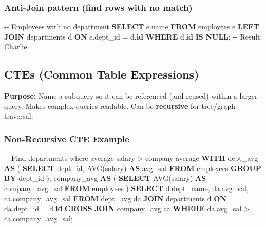 \documentclass[11pt]{article}
\newenvironment{Shaded}{\begin{snugshade}}{\end{snugshade}}
\newcommand{\CommentTok}[1]{\textcolor[rgb]{0.48,0.49,0.49}{#1}}
\newcommand{\FunctionTok}[1]{\textcolor[rgb]{0.56,0.27,0.68}{#1}}
\newcommand{\KeywordTok}[1]{\textcolor[rgb]{0.81,0.81,0.76}{\textbf{#1}}}
\newcommand{\NormalTok}[1]{\textcolor[rgb]{0.81,0.81,0.76}{#1}}
\newcommand{\OperatorTok}[1]{\textcolor[rgb]{0.81,0.81,0.76}{#1}}
\begin{document}
\subsubsection{Anti-Join pattern (find rows with no match)}\label{anti-join-pattern-find-rows-with-no-match}


\begin{Shaded}
\begin{Highlighting}[]
\CommentTok{{-}{-} Employees with no department}
\KeywordTok{SELECT}\NormalTok{ e.name}
\KeywordTok{FROM}\NormalTok{ employees e}
\KeywordTok{LEFT} \KeywordTok{JOIN}\NormalTok{ departments d }\KeywordTok{ON}\NormalTok{ e.dept\_id }\OperatorTok{=}\NormalTok{ d.}\KeywordTok{id}
\KeywordTok{WHERE}\NormalTok{ d.}\KeywordTok{id} \KeywordTok{IS} \KeywordTok{NULL}\NormalTok{;}
\CommentTok{{-}{-} Result: Charlie}
\end{Highlighting}
\end{Shaded}

\subsection{CTEs (Common Table Expressions)}\label{ctes-common-table-expressions}

\textbf{Purpose:} Name a subquery so it can be referenced (and reused) within a larger query. Makes complex queries readable. Can be \textbf{recursive} for tree/graph traversal.

\subsubsection{Non-Recursive CTE Example}\label{non-recursive-cte-example}


\begin{Shaded}
\begin{Highlighting}[]
\CommentTok{{-}{-} Find departments where average salary \textgreater{} company average}
\KeywordTok{WITH}\NormalTok{ dept\_avg }\KeywordTok{AS}\NormalTok{ (}
    \KeywordTok{SELECT}\NormalTok{ dept\_id,}
           \FunctionTok{AVG}\NormalTok{(salary) }\KeywordTok{AS}\NormalTok{ avg\_sal}
    \KeywordTok{FROM}\NormalTok{ employees}
    \KeywordTok{GROUP} \KeywordTok{BY}\NormalTok{ dept\_id}
\NormalTok{),}
\NormalTok{company\_avg }\KeywordTok{AS}\NormalTok{ (}
    \KeywordTok{SELECT} \FunctionTok{AVG}\NormalTok{(salary) }\KeywordTok{AS}\NormalTok{ company\_avg\_sal}
    \KeywordTok{FROM}\NormalTok{ employees}
\NormalTok{)}
\KeywordTok{SELECT}\NormalTok{ d.dept\_name, da.avg\_sal, ca.company\_avg\_sal}
\KeywordTok{FROM}\NormalTok{ dept\_avg da}
\KeywordTok{JOIN}\NormalTok{ departments d }\KeywordTok{ON}\NormalTok{ da.dept\_id }\OperatorTok{=}\NormalTok{ d.}\KeywordTok{id}
\KeywordTok{CROSS} \KeywordTok{JOIN}\NormalTok{ company\_avg ca}
\KeywordTok{WHERE}\NormalTok{ da.avg\_sal }\OperatorTok{\textgreater{}}\NormalTok{ ca.company\_avg\_sal;}
\end{Highlighting}
\end{Shaded}
\end{document}
